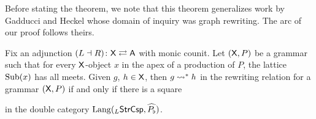 \documentclass{amsart}
\begin{document}
Before stating the theorem, we note that this theorem
generalizes work by Gadducci and Heckel
\cite{Gadd_IndGraphTrans} whose domain of
inquiry was graph rewriting. The arc of our
proof follows theirs.

\begin{theorem} \label{thm:inductive-rewriting}
  Fix an adjunction $ (L \dashv R) \colon \mathsf{X} \rightleftarrows \mathsf{A} $ with
  monic counit. Let $ ( \mathsf{X} , P ) $ be a grammar such that
  for every $ \mathsf{X} $-object $ x $ in the apex of a production
  of $ P $, the lattice $ \operatorname{Sub} (x) $ has all meets. Given
  $ g $, $ h \in \mathsf{X} $, then $ g \rightsquigarrow^\ast h $ in the
  rewriting relation for a grammar $ ( \mathsf{X} , P ) $ if and
  only if there is a square
   
  in the double category $ \mathrm{Lang} ( _{L}\mathsf{StrCsp} , \widehat{P_\flat} ) $.
\end{theorem}
\end{document}
